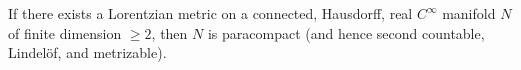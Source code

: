 If there exists a Lorentzian metric on a connected, Hausdorff, real $C^\infty$ manifold $N$ of finite dimension $\geq 2$, then $N$ is paracompact (and hence second countable, Lindel\"of, and metrizable).
